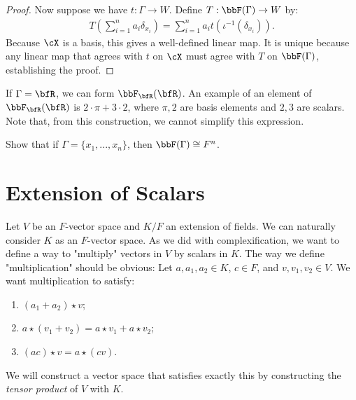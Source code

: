 \begin{proof}
            Now suppose we have $t: \Gamma \rightarrow W$. Define $T: \bbF(\Gamma) \rightarrow W$ by:
                \begin{equation*}
                \begin{split}
                    T \left(\sum_{i = 1}^n a_i \delta_{x_i}\right) = \sum_{i =1}^n a_i t(\iota^{-1}(\delta_{x_i})).
                \end{split}
                \end{equation*}
            Because $\cX$ is a basis, this gives a well-defined linear map. It is unique because any linear map that agrees with $t$ on $\cX$ must agree with $T$ on $\bbF(\Gamma)$, establishing the proof.
        \end{proof}

        \begin{example}
            If $\Gamma = \bfR$, we can form $\bbF_\bfR(\bfR)$. An example of  an element of $\bbF_\bfR(\bfR)$ is $2 \cdot \pi + 3 \cdot 2$, where $\pi,2$ are basis elements and $2,3$ are scalars. Note that, from this construction, we cannot simplify this expression.
        \end{example}
    
        \begin{exercise}
            Show that if $\Gamma = \{x_1,...,x_n\}$, then $\bbF(\Gamma) \cong F^n$.
        \end{exercise}

\section{Extension of Scalars}
    Let $V$ be an $F$-vector space and $K/F$ an extension of fields. We can naturally consider $K$ as an $F$-vector space. As we did with complexification, we want to define a way to "multiply" vectors in $V$ by scalars in $K$. The way we define "multiplication" should be obvious: Let $a, a_1,a_2 \in K$, $c\in F$, and $v,v_1,v_2 \in V$. We want multiplication to satisfy:
        \begin{enumerate}[label = (\arabic*)]
            \item $(a_1 + a_2) \star v$;
            \item $a \star (v_1 + v_2) = a \star v_1 + a \star v_2$;
            \item $(ac) \star v = a \star (cv)$.
        \end{enumerate}
    We will construct a vector space that satisfies exactly this by constructing the \textit{tensor product} of $V$ with $K$.

